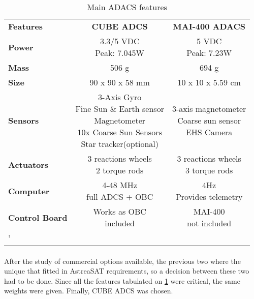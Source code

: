 \begin{longtable}{| l | c | c |}
	
	\hline
	\rowcolor[gray]{0.60} \multicolumn{3}{|c|}{\textbf{ADACS options }} \\
	\hline
	
	\hline
	\rowcolor[gray]{0.75}	\textbf{Features} &  \textbf{CUBE ADCS} & \textbf{MAI-400 ADACS} \\
	\hline
	
	\cellcolor[gray]{0.85} \textbf{Power} &\makecell{3.3/5 VDC\\ Peak: 7.045W }&  \makecell{5 VDC\\Peak: 7.23W}  \\ 	\hline
	\cellcolor[gray]{0.85} \textbf{Mass} & 506 g& 694 g\\ \hline
	\cellcolor[gray]{0.85} \textbf{Size} & 90 x 90 x 58 mm&10 x 10 x 5.59 cm \\ \hline
	\cellcolor[gray]{0.85} \textbf{Sensors} & \makecell{3-Axis Gyro\\Fine Sun \& Earth sensor \\ Magnetometer\\10x Coarse Sun Sensors \\Star tracker(optional)}& \makecell{3-axis magnetometer \\Coarse sun sensor\\EHS Camera}\\ 	\hline
	\cellcolor[gray]{0.85} \textbf{Actuators} &  \makecell{3 reactions wheels\\2 torque rods} & \makecell{3 reactions wheels\\3 torque rods}\\ 	\hline
	\cellcolor[gray]{0.85} \textbf{Computer} &\makecell{4-48 MHz\\ full ADCS + OBC}  & \makecell{4Hz\\Provides telemetry}\\ \hline
	\cellcolor[gray]{0.85} \textbf{Control Board} & \makecell{Works as OBC\\included}& \makecell{MAI-400\\ not included}\\
	\hline
	'
	\caption{Main ADACS features}
	\label{ADACS}
	
\end{longtable}

\paragraph{}  After the study of commercial options available, the previous two where the unique that fitted in AstreaSAT requirements, so a decision between these two had to be done. Since all the features tabulated on \ref{ADACS} were critical, the same weights were given. Finally, CUBE ADCS was chosen.\\
